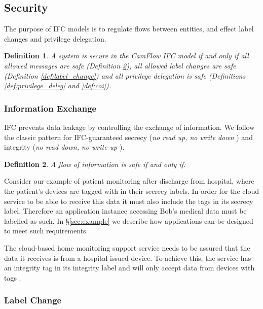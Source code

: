 \documentclass[10pt,journal,compsoc]{IEEEtran}
\newtheorem{definition}{Definition}
\begin{document}
\subsection{Security}
\label{sec:ifc:security}

The purpose of IFC models is to regulate flows between entities, and effect label changes and privilege delegation.

\begin{definition}
\label{def:safe_system}
A system is secure in the CamFlow IFC model if and only if all allowed messages are safe (Definition \ref{def:safe_message}), all allowed label changes are safe (Definition \ref{def:label_change})  and all privilege delegation is safe (Definitions \ref{def:privilege_deleg} and \ref{def:coi}).
\end{definition}

\subsubsection{Information Exchange}
\label{safemsg}

IFC prevents data leakage by controlling the exchange of information. We follow the classic pattern for IFC-guaranteed secrecy (\emph{no read up, no write down} \cite{bell73}) and integrity (\emph{no read down, no write up} \cite{citeulike:3017234}).

\begin{definition}
\label{def:safe_message}
A flow of information  is safe if and only if:

\end{definition}

Consider our example of patient monitoring after discharge from hospital, where the patient's devices are tagged with  in their secrecy labels. In order for the cloud service to be able to receive this data it must also include the tags  in its secrecy label.
Therefore an application instance accessing Bob's medical data must be labelled as such. In \S\ref{sec:example} we describe how applications can be designed to meet such requirements.
 
The cloud-based home monitoring support service needs to be assured that the data it receives is from a hospital-issued device. To achieve this, the service has an integrity tag  in its integrity label and will only accept data from devices with tags .

\subsubsection{Label Change} 
\label{sec:ifc:safe_label}
\end{document}
